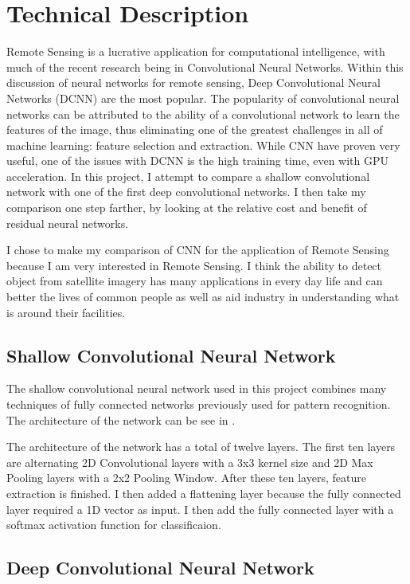 \documentclass[12pt]{article}
\begin{document}
	\section{Technical Description}
	
Remote Sensing is a lucrative application for computational intelligence, with much of the recent research being in Convolutional Neural Networks. Within this discussion of neural networks for remote sensing, Deep Convolutional Neural Networks (DCNN) are the most popular. The popularity of convolutional neural networks can be attributed to the ability of a convolutional network to learn the features of the image, thus eliminating one of the greatest challenges in all of machine learning: feature selection and extraction. While CNN have proven very useful, one of the issues with DCNN is the high training time, even with GPU acceleration. In this project, I attempt to compare a shallow convolutional network with one of the first deep convolutional networks. I then take my comparison one step farther, by looking at the relative cost and benefit of residual neural networks. 
		
I chose to make my comparison of CNN for the application of Remote Sensing because I am very interested in Remote Sensing. I think the ability to detect object from satellite imagery has many applications in every day life and can better the lives of common people as well as aid industry in understanding what is around their facilities. 
		
		\subsection{Shallow Convolutional Neural Network}
		
The shallow convolutional neural network used in this project combines many techniques of fully connected networks previously used for pattern recognition. The architecture of the network can be see in .
		
The architecture of the network has a total of twelve layers. The first ten layers are alternating 2D Convolutional layers with a 3x3 kernel size and 2D Max Pooling layers with a 2x2 Pooling Window. After these ten layers, feature extraction is finished. I then added a flattening layer because the fully connected layer required a 1D vector as input. I then add the fully connected layer with a softmax activation function for classificaion.
		
		
		\subsection{Deep Convolutional Neural Network}
		
\end{document}
